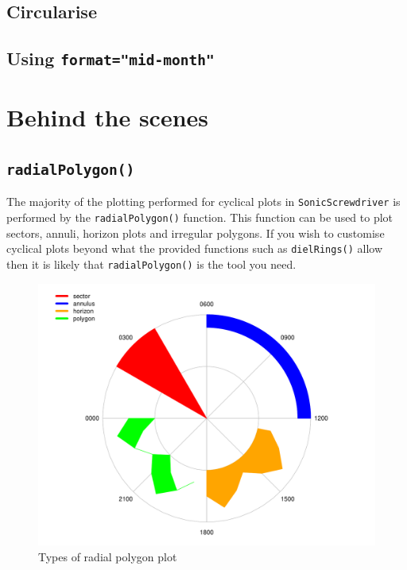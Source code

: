\documentclass[
]{book}
\begin{document}
\hypertarget{circularise}{%
\subsection{Circularise}\label{circularise}}

\hypertarget{using-formatmid-month}{%
\subsection{\texorpdfstring{Using \texttt{format="mid-month"}}{Using format="mid-month"}}\label{using-formatmid-month}}

\hypertarget{behind-the-scenes}{%
\section{Behind the scenes}\label{behind-the-scenes}}

\hypertarget{radialpolygon}{%
\subsection{\texorpdfstring{\texttt{radialPolygon()}}{radialPolygon()}}\label{radialpolygon}}

The majority of the plotting performed for cyclical plots in \texttt{SonicScrewdriver} is performed by the \texttt{radialPolygon()} function. This function can be used to plot sectors, annuli, horizon plots and irregular polygons. If you wish to customise cyclical plots beyond what the provided functions such as \texttt{dielRings()} allow then it is likely that \texttt{radialPolygon()} is the tool you need.

\begin{figure}

{\centering \includegraphics[width=0.9\linewidth]{_main_files/figure-latex/radialPolygon-types-1} 

}

\caption{Types of radial polygon plot}\label{fig:radialPolygon-types}
\end{figure}
\end{document}
